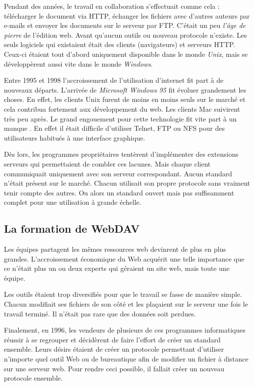 \documentclass[a4paper, 11pt]{article}
\begin{document}
{		Pendant des années, le travail en collaboration s'effectuait comme cela : télécharger le document via HTTP, échanger les fichiers avec d'autres auteurs par e-mails et envoyer les documents sur le serveur par FTP. C'était un peu \emph{l'âge de pierre} de l'édition web. Avant qu'aucun outils ou nouveau protocole n'existe. Les seuls logiciels qui existaient était des clients (navigateurs) et serveurs HTTP. Ceux-ci étaient tout d'abord uniquement disponible dans le monde \emph{Unix}, mais se développèrent aussi vite dans le monde \emph{Windows}.
		
		Entre 1995 et 1998 l'accroissement de l'utilisation d'internet fit part à de nouveaux départs. L'arrivée de \emph{Microsoft Windows 95} fit évoluer grandement les choses. En effet, les clients Unix furent de moins en moins seuls sur le marché et cela contribua fortement aux développement du web. Les clients Mac suivirent très peu après. Le grand engouement pour cette technologie fit vite part à un manque . En effet il était difficile d'utiliser Telnet, FTP ou NFS pour des utilisateurs habitués à une interface graphique. 
		
	Dès lors, les programmes propriétaires tentèrent d'implémenter des extensions serveurs qui permettaient de combler ces lacunes. Mais chaque client communiquait uniquement avec son serveur correspondant. Aucun standard n'était présent sur le marché. Chacun utilisait son propre protocole sans vraiment tenir compte des autres. Ou alors un standard ouvert mais pas suffisamment complet pour une utilisation à grande échelle.
		
	\subsection{La formation de WebDAV}
	
		Les équipes partagent les mêmes ressources web devinrent de plus en plus grandes. L'accroissement économique du Web acquérit une telle importance que ce n'était plus un ou deux experts qui géraient un site web, mais toute une équipe.
		
		Les outils étaient trop diversifiés pour que le travail se fasse de manière simple. Chacun modifiait ses fichiers de son côté et les plaçaient sur le serveur une fois le travail terminé. Il n'était pas rare que des données soit perdues.
		
		Finalement, en 1996, les vendeurs de plusieurs de ces programmes informatiques réussir à se regrouper et décidèrent de faire l'effort de créer un standard ensemble. Leurs désirs étaient de créer un protocole permettant d'utiliser n'importe quel outil Web ou de bureautique afin de modifier un fichier à distance sur une serveur web. Pour rendre ceci possible, il fallait créer un nouveau protocole ensemble.
		
}
\end{document}
